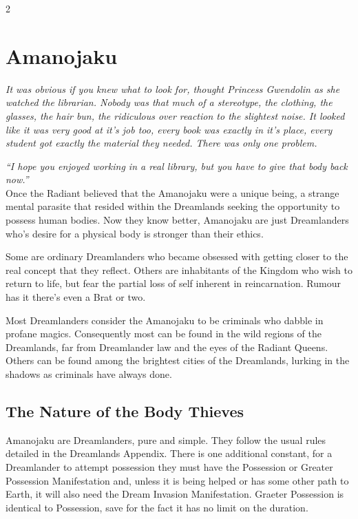 \begin{multicols}{2}
\section*{Amanojaku}
\label{sec:Amanojaku}

\textit{It was obvious if you knew what to look for, thought Princess Gwendolin as she watched the librarian. Nobody was that much of a stereotype, the clothing, the glasses, the hair bun, the ridiculous over reaction to the slightest noise. It looked like it was very good at it's job too, every book was exactly in it's place, every student got exactly the material they needed. There was only one problem.}

\textit{\textquotedblleft I hope you enjoyed working in a real library, but you have to give that body back now.\textquotedblright}\\

\noindent Once the Radiant believed that the Amanojaku were a unique being, a strange mental parasite that resided within the Dreamlands seeking the opportunity to possess human bodies. Now they know better, Amanojaku are just Dreamlanders who's desire for a physical body is stronger than their ethics. 

Some are ordinary Dreamlanders who became obsessed with getting closer to the real concept that they reflect. Others are inhabitants of the Kingdom who wish to return to life, but fear the partial loss of self inherent in reincarnation. Rumour has it there's even a Brat or two.

Most Dreamlanders consider the Amanojaku to be criminals who dabble in profane magics. Consequently most can be found in the wild regions of the Dreamlands, far from Dreamlander law and the eyes of the Radiant Queens. Others can be found among the brightest cities of the Dreamlands, lurking in the shadows as criminals have always done. 

\subsection*{The Nature of the Body Thieves}

Amanojaku are Dreamlanders, pure and simple. They follow the usual rules detailed in the Dreamlands Appendix. There is one additional constant, for a Dreamlander to attempt possession they must have the Possession or Greater Possession Manifestation and, unless it is being helped or has some other path to Earth, it will also need the Dream Invasion Manifestation. Graeter Possession is identical to Possession, save for the fact it has no limit on the duration. 


\end{multicols}
